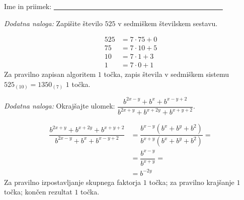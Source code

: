 \documentclass[addpoints,12pt]{exam}
\begin{document}
\begin{questions}
\begin{parts}
        \end{parts}








     \newpage

     \noindent Ime in priimek: \underline{~~~~~~~~~~~~~~~~~~~~~~~~~~~~~~~~~~~~~~~~~~~~~~~~}

     

    \bonusquestion[2]
    \textit{Dodatna naloga:} Zapišite število $525$ v sedmiškem številskem sestavu.

    \begin{solution}[9cm]
        \begin{align*}
            525 &= 7\cdot 75 + 0 \\
            75 &= 7\cdot 10 + 5 \\
            10 &= 7\cdot 1 + 3 \\
            1 &= 7\cdot 0 + 1
        \end{align*}
        Za pravilno zapisan algoritem $1$ točka, zapis števila v sedmiškem sistemu $525_{(10)}=1350_{(7)}$ $1$ točka.
    \end{solution}




        

    \bonusquestion[3]
    \textit{Dodatna naloga:} Okrajšajte ulomek: $\dfrac{b^{2x-y}+b^x+b^{x-y+2}}{b^{2x+y}+b^{x+2y}+b^{x+y+2}}$.

    \begin{solution}[7cm]
        \begin{align*}
            \dfrac{b^{2x+y}+b^{x+2y}+b^{x+y+2}}{b^{2x-y}+b^x+b^{x-y+2}} &= \dfrac{b^{x-y}(b^x+b^y+b^2)}{b^{x+y}(b^x+b^y+b^2)}= \\
                                                                        &= \dfrac{b^{x-y}}{b^{x+y}}= \\
                                                                        &= b^{-2y}
        \end{align*}
        Za pravilno izpostavljanje skupnega faktorja $1$ točka; za pravilno krajšanje $1$ točka; končen rezultat $1$ točka.
    \end{solution}




\end{questions}
\end{document}
